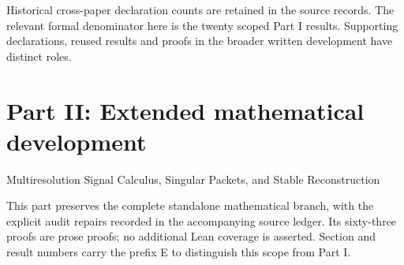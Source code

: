 \documentclass[11pt,letterpaper]{article}
\theoremstyle{plain}
\theoremstyle{plain}
\theoremstyle{plain}
\theoremstyle{definition}
\theoremstyle{definition}
\theoremstyle{definition}
\theoremstyle{definition}
\theoremstyle{remark}
\theoremstyle{remark}
\theoremstyle{remark}
\theoremstyle{remark}
\begin{document}
Historical cross-paper declaration counts are retained in the source records. The relevant formal denominator here is the twenty scoped Part I results. Supporting declarations, reused results and proofs in the broader written development have distinct roles.

\clearpage
\part*{Part II: Extended mathematical development}
\begin{center}\large Multiresolution Signal Calculus, Singular Packets, and Stable Reconstruction\end{center}
\noindent This part preserves the complete standalone mathematical branch, with the explicit audit repairs recorded in the accompanying source ledger. Its sixty-three proofs are prose proofs; no additional Lean coverage is asserted. Section and result numbers carry the prefix E to distinguish this scope from Part I.
\setcounter{section}{0}\setcounter{figure}{0}\setcounter{table}{0}
\renewcommand{\thesection}{E\arabic{section}}
\renewcommand{\theHsection}{extension.\arabic{section}}
\renewcommand{\thefigure}{E\arabic{figure}}
\renewcommand{\theHfigure}{extension.\arabic{figure}}
\renewcommand{\thetable}{E\arabic{table}}
\renewcommand{\theHtable}{extension.\arabic{table}}
\graphicspath{{extension_figures/}}

\begin{abstract}
Signals on a lattice admit exact coordinates indexed by the residue classes of every finite index sublattice. Convolution becomes a matrix of packet transfers, while filter banks and packet trees become exact changes of coordinates. We develop this structure on sequence spaces, prove quantitative stability for imperfect and perturbed banks, and give an exact dynamic recursion for adaptive packet trees. A singular signal is written as a smooth component plus step or truncated power packets that record jumps in the signal and its derivatives. Retaining the correct packets leaves only the smooth approximation error. Estimated packets are governed by exact formulas involving value error, region overlap, boundary displacement, and the norm of the smooth approximation operator. The main recovery result treats separated jumps sampled on a uniform grid. An explicit contrast gap gives exact recovery of every jump cell, grid scale location accuracy, amplitude control, and finite norm consistency. Probability bounds cover sub-Gaussian noise and repeated measurements. Haar coefficients, two shifted grids, and annihilating differences give complementary localization results. The final sections treat Gibbs oscillation, nonlinear residue interactions, numerical illustrations, and cyclic Cayley coordinates.
\end{abstract}
\end{document}
